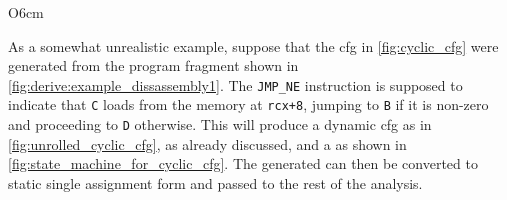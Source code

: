 \begin{wrapfigure}{O}{6cm}
  \vspace{-20pt}
  \vspace{-12pt}
  \caption{}
  \label{fig:derive:example_dissassembly1}
  \vspace{-24pt}
\end{wrapfigure}
As a somewhat unrealistic example, suppose that the \gls{cfg} in
\autoref{fig:cyclic_cfg} were generated from the program fragment shown
in \autoref{fig:derive:example_dissassembly1}.  The \verb|JMP_NE|
instruction is supposed to
indicate that \verb|C| loads from the
memory at \verb|rcx+8|, jumping to \verb|B| if it is non-zero and
proceeding to \verb|D| otherwise.  This will produce a dynamic
\gls{cfg} as in \autoref{fig:unrolled_cyclic_cfg}, as already
discussed, and a {\StateMachine} as shown in
\autoref{fig:state_machine_for_cyclic_cfg}.  The generated
        {\StateMachine} can then be converted to static single
        assignment\needCite{} form and passed to the rest of the
        analysis.

